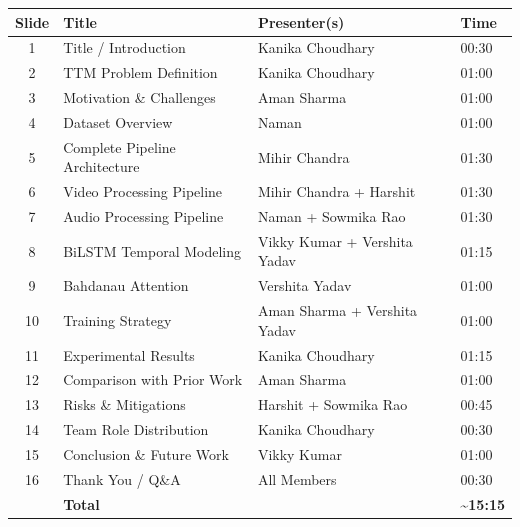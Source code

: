 \documentclass[11pt, a4paper]{article}
\begin{document}
\begin{center}
\renewcommand{\arraystretch}{1.4}
\begin{tabular}{@{} c p{5cm} p{4.2cm} p{2.5cm} @{}}
\toprule
\rowcolor{NavyBlue}
\color{white}\bfseries Slide & \color{white}\bfseries Title & \color{white}\bfseries Presenter(s) & \color{white}\bfseries Time \\
\midrule
1  & Title / Introduction          & Kanika Choudhary                & 00:30 \\
\rowcolor{AccBlue!8}
2  & TTM Problem Definition        & Kanika Choudhary                & 01:00 \\
3  & Motivation \& Challenges      & Aman Sharma                     & 01:00 \\
\rowcolor{AccBlue!8}
4  & Dataset Overview              & Naman                           & 01:00 \\
5  & Complete Pipeline Architecture & Mihir Chandra                  & 01:30 \\
\rowcolor{AccBlue!8}
6  & Video Processing Pipeline     & Mihir Chandra + Harshit         & 01:30 \\
7  & Audio Processing Pipeline     & Naman + Sowmika Rao             & 01:30 \\
\rowcolor{AccBlue!8}
8  & BiLSTM Temporal Modeling      & Vikky Kumar + Vershita Yadav    & 01:15 \\
9  & Bahdanau Attention            & Vershita Yadav                  & 01:00 \\
\rowcolor{AccBlue!8}
10 & Training Strategy             & Aman Sharma + Vershita Yadav    & 01:00 \\
11 & Experimental Results          & Kanika Choudhary                & 01:15 \\
\rowcolor{AccBlue!8}
12 & Comparison with Prior Work    & Aman Sharma                     & 01:00 \\
13 & Risks \& Mitigations          & Harshit + Sowmika Rao           & 00:45 \\
\rowcolor{AccBlue!8}
14 & Team Role Distribution        & Kanika Choudhary                & 00:30 \\
15 & Conclusion \& Future Work     & Vikky Kumar                     & 01:00 \\
\rowcolor{AccBlue!8}
16 & Thank You / Q\&A              & All Members                     & 00:30 \\
\midrule
   & \textbf{Total}               &                                 & \textbf{\textasciitilde 15:15} \\
\bottomrule
\end{tabular}
\end{center}
\end{document}
